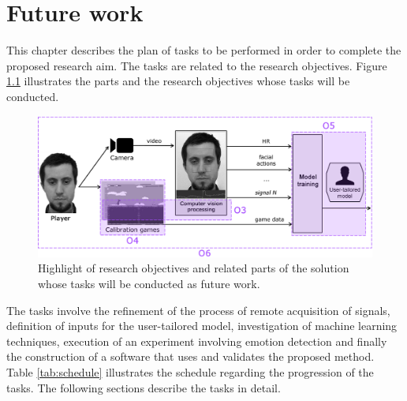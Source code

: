 \chapter{Future work}
\label{ch:closing}

This chapter describes the plan of tasks to be performed in order to complete the proposed research aim. The tasks are related to the research objectives. Figure \ref{fig:future-work-objectives} illustrates the parts and the research objectives whose tasks will be conducted.

\begin{figure}[h]
    \centering
    \includegraphics[width=\textwidth]{figures/future-work-objectives.png}
    \caption{Highlight of research objectives and related parts of the solution whose tasks will be conducted as future work.}
    \label{fig:future-work-objectives}
\end{figure}

The tasks involve the refinement of the process of remote acquisition of signals, definition of inputs for the user-tailored model, investigation of machine learning techniques, execution of an experiment involving emotion detection and finally the construction of a software that uses and validates the proposed method. Table \ref{tab:schedule} illustrates the schedule regarding the progression of the tasks. The following sections describe the tasks in detail.

